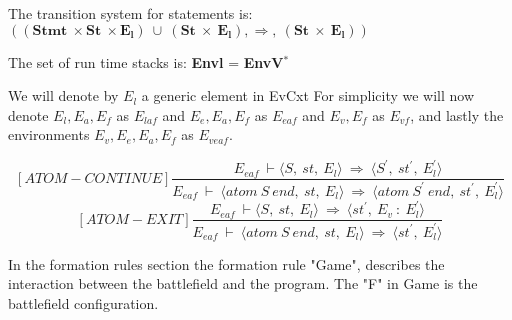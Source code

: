 The transition system for statements is:
\begin{math}		
((\boldsymbol{Stmt} \ \times \boldsymbol{St} \ \times \boldsymbol{E_l}) \ \cup \ (\boldsymbol{St} \ \times \ \boldsymbol{E_l}), \Rightarrow, \ (\boldsymbol{St} \ \times \ \boldsymbol{E_l}))		
\end{math}

The set of run time stacks is:
\textbf{Envl} = \textbf{EnvV}\begin{math}		
^*		
\end{math}

We will denote by \begin{math} E_l \end{math} a generic element in EvCxt
For simplicity we will now denote \begin{math} E_l, E_a, E_f \end{math} as \begin{math} E_{laf} \end{math} and \begin{math} E_e, E_a, E_f \end{math} as \begin{math} E_{eaf} \end{math} and \begin{math} E_v, E_f \end{math} as \begin{math} E_{vf} \end{math}, and lastly the environments \begin{math} E_v, E_e, E_a, E_f \end{math} as \begin{math} E_{veaf} \end{math}.

\[	
[ATOM-CONTINUE]	
\dfrac{E_{eaf} \ \vdash \langle S, \ st, \ E_l \rangle \ \Rightarrow \ \langle S^{'}, \ st^{'}, \ E_l^{'} \rangle}{E_{eaf} \ \vdash \ \langle atom \ S \ end, \ st, \ E_l \rangle \ \Rightarrow \ \langle atom \ S^{'} \ end, \ st^{'}, \ E_l^{'} \rangle}	
\]\newline
\[	
[ATOM-EXIT]	
\dfrac{E_{eaf} \ \vdash \langle S, \ st, \ E_l \rangle \ \Rightarrow \ \langle st^{'}, \ E_v \ : \ E_l^{'} \rangle}{E_{eaf} \ \vdash \ \langle atom \ S \ end, \ st, \ E_l \rangle \ \Rightarrow \ \langle st^{'}, \ E_l^{'} \rangle}	
\]

In the formation rules section the formation rule "Game", describes the interaction between the battlefield and the program. The "F" in Game is the battlefield configuration. 

